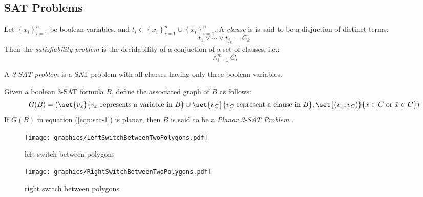 \subsection{SAT Problems}
\begin{prob}\label{prob:ncpi-6}%
Let $\left\lbrace x_i \right\rbrace_{i=1}^{n} $ be boolean variables, and $t_i \in \left\lbrace x_i\right\rbrace_{i=1}^{n}  \cup \left\lbrace \bar{x}_i\right\rbrace_{i=1}^{n}   $.  A \textit{clause} is is said to be a disjuction of distinct terms:
$$
t_1 \vee \cdots \vee t_{j_k} = C_k
$$
Then the \textit{satisfiability problem} is the decidability of a conjuction of a set of clauses, i.e.:
$$ \wedge_{i=1}^m C_i$$
\end{prob} \cite{skiena2009algorithm}
A \textit{3-SAT problem} is a SAT problem with all clauses having only three boolean variables. 
\begin{definition}\label{def:sat-1}
Given a boolean 3-SAT formula $B$, define the associated graph of $B$ as follows:  
\begin{equation}\label{eqn:sat-1}
G(B) = \left(\set{v_x}{v_x\text{ represents a variable in }B} \cup \set{v_C}{v_C\text{ represent a clause in }B}  , \set{\left( v_x, v_C\right) }{x \in C \text{ or } \bar{x} \in C}  \right) 
\end{equation} 
If $G(B)$ in equation (\ref{eqn:sat-1}) is planar, then $B$ is said to be a \textit{Planar 3-SAT Problem} \cite{mulzer2008minimum}.
\end{definition} 
\begin{figure}[!h]
\begin{center}
\texttt{[image: graphics/LeftSwitchBetweenTwoPolygons.pdf]}
\caption{left switch between polygons}
\end{center} 
\end{figure} 
\begin{figure}[!h]
\begin{center}
\texttt{[image: graphics/RightSwitchBetweenTwoPolygons.pdf]}
\caption{right switch between polygons}
\end{center} 
\end{figure} 